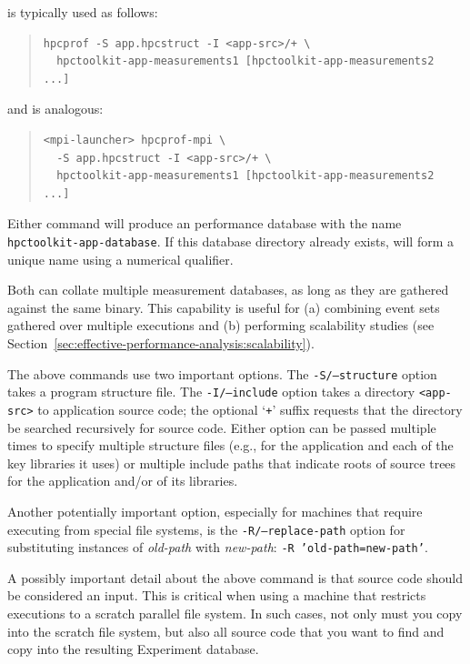 \documentclass[11pt,letterpaper]{report}
\begin{document}
\hpcprof{} is typically used as follows:
\begin{quote}
\begin{verbatim}
hpcprof -S app.hpcstruct -I <app-src>/+ \
  hpctoolkit-app-measurements1 [hpctoolkit-app-measurements2 ...]
\end{verbatim}
\end{quote}
and \hpcprofmpi{} is analogous:
\begin{quote}
\begin{verbatim}
<mpi-launcher> hpcprof-mpi \
  -S app.hpcstruct -I <app-src>/+ \
  hpctoolkit-app-measurements1 [hpctoolkit-app-measurements2 ...]
\end{verbatim}
\end{quote}
Either command will produce an \HPCToolkit{} performance database with the name \texttt{hpctoolkit-app-database}.
If this database directory already exists, \hpcprofAll{} will form a unique name using a numerical qualifier.

Both \hpcprofAll{} can collate multiple measurement databases, as long as they are gathered against the same binary.
This capability is useful for (a) combining event sets gathered over multiple executions and (b) performing scalability studies (see Section~\ref{sec:effective-performance-analysis:scalability}).

The above commands use two important options.
The \texttt{-S/--structure} option takes a program structure file.
The \texttt{-I/--include} option takes a directory \texttt{<app-src>} to application source code; the optional `\texttt{+}' suffix requests that the directory be searched recursively for source code.
Either option can be passed multiple times to specify multiple structure files (e.g., for the application and each of the key libraries it uses) or multiple include paths that indicate  roots of source trees for the application and/or of its libraries. 

Another potentially important option, especially for machines that require executing from special file systems, is the \texttt{-R/--replace-path} option for substituting instances of \emph{old-path} with \emph{new-path}: \texttt{-R 'old-path=new-path'}.

A possibly important detail about the above command is that source code should be considered an \hpcprofAll{} input.
This is critical when using a machine that restricts executions to a scratch parallel file system.
In such cases, not only must you copy \hpcprofmpi{} into the scratch file system, but also all source code that you want \hpcprofmpi{} to find and copy into the resulting Experiment database.
\end{document}
